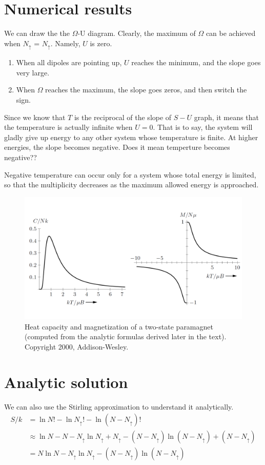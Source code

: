 \section{Numerical results}

We can draw the the $\Omega$-U diagram. Clearly, the maximum of $\Omega$ can be achieved when $N_{\uparrow}$ = $N_{\uparrow}$. Namely, $U$ is zero.
\begin{enumerate}
    \item When all dipoles are pointing up, $U$ reaches the minimum, and the slope goes very large. 
    \item When $\Omega$ reaches the maximum, the slope goes zeros, and then switch the sign.
\end{enumerate}

Since we know that $T$ is the reciprocal of the slope of $S-U$ graph, it means that the temperature is actually infinite when $U=0$. That is to say, the system will gladly give up energy to any other system whose temperature is finite. At higher energies, the slope becomes negative. Does it mean temperture becomes negative??

Negative temperature can occur only for a system whose total energy is limited, so that the multiplicity decreases as the maximum allowed energy is approached. 


\begin{figure}[ht]
    \centering
    \includegraphics[width=0.9\linewidth]{imgs/Magnetic.pdf}
    \caption{Heat capacity and magnetization of a two-state paramagnet (computed
from the analytic formulas derived later in the text). Copyright 2000,
Addison-Wesley.}
    \label{fig:results}
\end{figure}

\section{Analytic solution}
We can also use the Stirling approximation to understand it analytically.
\begin{equation} 
\begin{split}
    S/k & = \ln N! - \ln N_\uparrow ! - \ln (N-N_\uparrow)! \\
        & \approx \ln N - N - N_\uparrow \ln N_\uparrow + N_\uparrow - (N-N_\uparrow)\ln(N-N_\uparrow) + (N-N_\uparrow) \\
        & = N\ln N - N_\uparrow \ln N_\uparrow - (N-N_\uparrow) \ln(N-N_\uparrow)
\end{split}
\end{equation}


